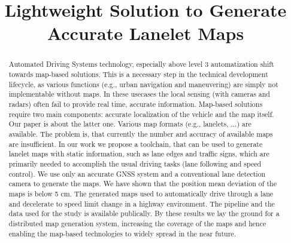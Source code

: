 \documentclass[conference]{IEEEtran}
\begin{document}
\title{Lightweight Solution to Generate Accurate Lanelet Maps\\
}

\author{
\and
{}
\and
{}
}

\maketitle

\begin{abstract}
Automated Driving Systems technology, especially above level 3 automatization shift towards map-based solutions. This is a necessary step in the technical development lifecycle, as various functions (e.g., urban 
navigation and maneuvering) are simply not implementable without maps. In these usecases the local sensing (with cameras and radars) often fail to provide real time, accurate information. Map-based solutions 
require two main components: accurate localization of the vehicle and the map itself. Our paper is about the latter one. Various map formats (e.g., lanelets, ...) are available. The problem is, that currently 
the number and accuracy of available maps are insufficient. In our work we propose a toolchain, that can be used to generate lanelet maps with static information, such as lane edges and traffic signs, which 
are primarily needed to accomplish the usual driving tasks (lane following and speed control). We use only an accurate GNSS system and a conventional lane detection camera to generate the maps. We have shown 
that the position mean deviation of the maps is below 5 cm. The generated maps used to automatically drive through a lane and decelerate to speed limit change in a highway environment. The pipeline and the 
data used for the study is available publically. By these results we lay the ground for a distributed map generation system, increasing the coverage of the maps and hence enabling the map-based technologies 
to widely spread in the near future.
\end{abstract}
\end{document}
